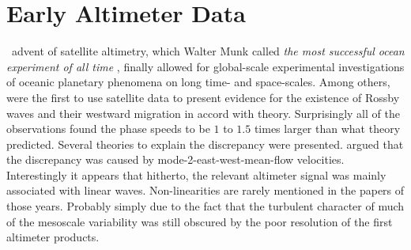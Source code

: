 




\section*{Early Altimeter Data}\label{sec:hist_killworth}

~advent of satellite altimetry, which Walter Munk called \textit{the most successful ocean experiment of all time} \citep{munk2002}, finally allowed for
global-scale experimental investigations of oceanic planetary phenomena on long time- and space-scales. Among others,
\citet{matano1993seasonal,cipollini1997concurrent,le1993sea} were the first to use satellite data to present evidence for the existence of Rossby waves and their
westward migration in accord with theory. Surprisingly all of the observations found the phase speeds to be $1$ to $1.5$ times larger than what theory
predicted. Several theories to explain the discrepancy were presented. \Eg \citet{Killworth1997a} argued that the discrepancy was caused by
mode-2-east-west-mean-flow velocities. Interestingly it appears that hitherto, the relevant altimeter signal was mainly associated with linear waves.
Non-linearities are rarely mentioned in the papers of those years. Probably simply due to the fact that the turbulent character of much of the
mesoscale variability was still obscured by the poor resolution of the first altimeter products.

